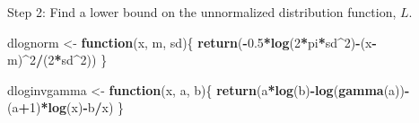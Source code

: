 \documentclass[
]{article}
\newenvironment{Shaded}{\begin{snugshade}}{\end{snugshade}}
\newcommand{\ControlFlowTok}[1]{\textcolor[rgb]{0.13,0.29,0.53}{\textbf{#1}}}
\newcommand{\DecValTok}[1]{\textcolor[rgb]{0.00,0.00,0.81}{#1}}
\newcommand{\FloatTok}[1]{\textcolor[rgb]{0.00,0.00,0.81}{#1}}
\newcommand{\FunctionTok}[1]{\textcolor[rgb]{0.13,0.29,0.53}{\textbf{#1}}}
\newcommand{\NormalTok}[1]{#1}
\newcommand{\OtherTok}[1]{\textcolor[rgb]{0.56,0.35,0.01}{#1}}
\newcommand{\SpecialCharTok}[1]{\textcolor[rgb]{0.81,0.36,0.00}{\textbf{#1}}}
\begin{document}
Step 2: Find a lower bound on the unnormalized distribution function,
\(L\).

\begin{Shaded}
\begin{Highlighting}[]
\NormalTok{dlognorm }\OtherTok{\textless{}{-}} \ControlFlowTok{function}\NormalTok{(x, m, sd)\{}
  \FunctionTok{return}\NormalTok{(}\SpecialCharTok{{-}}\FloatTok{0.5}\SpecialCharTok{*}\FunctionTok{log}\NormalTok{(}\DecValTok{2}\SpecialCharTok{*}\NormalTok{pi}\SpecialCharTok{*}\NormalTok{sd}\SpecialCharTok{\^{}}\DecValTok{2}\NormalTok{)}\SpecialCharTok{{-}}\NormalTok{(x}\SpecialCharTok{{-}}\NormalTok{m)}\SpecialCharTok{\^{}}\DecValTok{2}\SpecialCharTok{/}\NormalTok{(}\DecValTok{2}\SpecialCharTok{*}\NormalTok{sd}\SpecialCharTok{\^{}}\DecValTok{2}\NormalTok{))}
\NormalTok{\}}

\NormalTok{dloginvgamma }\OtherTok{\textless{}{-}} \ControlFlowTok{function}\NormalTok{(x, a, b)\{}
  \FunctionTok{return}\NormalTok{(a}\SpecialCharTok{*}\FunctionTok{log}\NormalTok{(b)}\SpecialCharTok{{-}}\FunctionTok{log}\NormalTok{(}\FunctionTok{gamma}\NormalTok{(a))}\SpecialCharTok{{-}}\NormalTok{(a}\SpecialCharTok{+}\DecValTok{1}\NormalTok{)}\SpecialCharTok{*}\FunctionTok{log}\NormalTok{(x)}\SpecialCharTok{{-}}\NormalTok{b}\SpecialCharTok{/}\NormalTok{x)}
\NormalTok{\}}
\end{Highlighting}
\end{Shaded}
\end{document}
